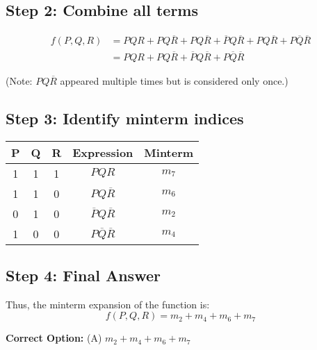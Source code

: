 \documentclass{article}
\begin{document}
\subsection*{Step 2: Combine all terms}

\begin{align*}
f(P, Q, R) &= PQR + PQ\overline{R} + PQ\overline{R} + \overline{P}Q\overline{R} + PQ\overline{R} + P\overline{Q}\overline{R} \\
&= PQR + PQ\overline{R} + \overline{P}Q\overline{R} + P\overline{Q}\overline{R}
\end{align*}

(Note: $PQ\overline{R}$ appeared multiple times but is considered only once.)

\subsection*{Step 3: Identify minterm indices}

\begin{center}
\begin{tabular}{|c|c|c|c|c|}
\hline
P & Q & R & Expression & Minterm \\
\hline
1 & 1 & 1 & $PQR$ & $m_7$ \\
1 & 1 & 0 & $PQ\overline{R}$ & $m_6$ \\
0 & 1 & 0 & $\overline{P}Q\overline{R}$ & $m_2$ \\
1 & 0 & 0 & $P\overline{Q}\overline{R}$ & $m_4$ \\
\hline
\end{tabular}
\end{center}

\subsection*{Step 4: Final Answer}

Thus, the minterm expansion of the function is:
\[
f(P, Q, R) = m_2 + m_4 + m_6 + m_7
\]

\noindent \textbf{Correct Option:} (A) $m_2 + m_4 + m_6 + m_7$
\end{document}
